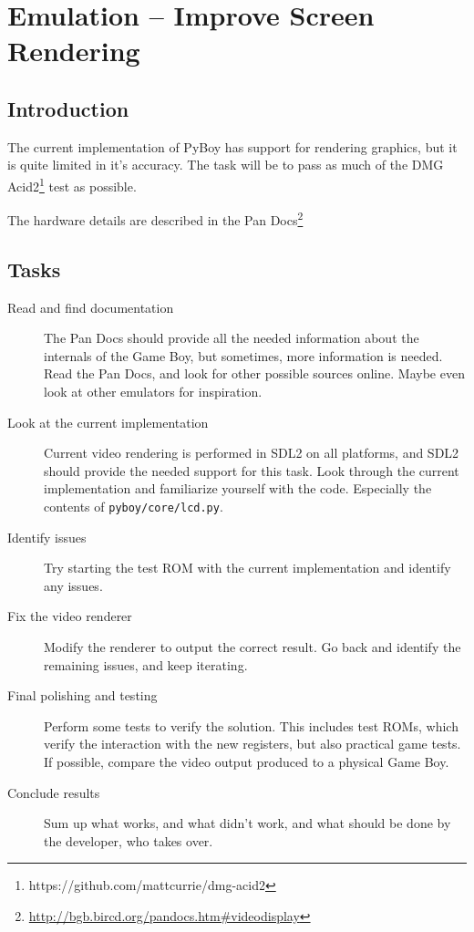 \documentclass[11pt]{report} %
\begin{document}
\chapter*{Emulation -- Improve Screen Rendering}
\section*{Introduction}
The current implementation of PyBoy has support for rendering graphics, but it is quite limited in it's accuracy. The task will be to pass as much of the DMG Acid2\footnote{https://github.com/mattcurrie/dmg-acid2} test as possible.

The hardware details are described in the Pan Docs\footnote{\url{http://bgb.bircd.org/pandocs.htm#videodisplay}}

\section*{Tasks}
\begin{description}
    \item [Read and find documentation]
        The Pan Docs should provide all the needed information about the internals of the Game Boy, but sometimes, more information is needed. Read the Pan Docs, and look for other possible sources online. Maybe even look at other emulators for inspiration.

    \item [Look at the current implementation]
        Current video rendering is performed in SDL2 on all platforms, and SDL2 should provide the needed support for this task. Look through the current implementation and familiarize yourself with the code. Especially the contents of \texttt{pyboy/core/lcd.py}.

    \item [Identify issues]
        Try starting the test ROM with the current implementation and identify any issues.

    \item [Fix the video renderer]
        Modify the renderer to output the correct result. Go back and identify the remaining issues, and keep iterating.

    \item [Final polishing and testing]
        Perform some tests to verify the solution. This includes test ROMs, which verify the interaction with the new registers, but also practical game tests. If possible, compare the video output produced to a physical Game Boy.

    \item [Conclude results]
        Sum up what works, and what didn't work, and what should be done by the developer, who takes over.

\end{description}
\end{document}
